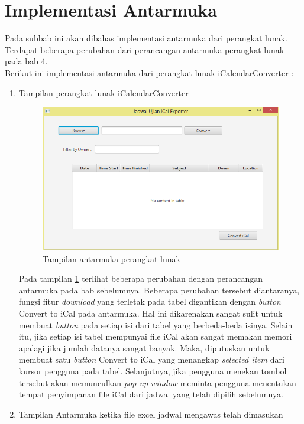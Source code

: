 \section{Implementasi Antarmuka}
Pada subbab ini akan dibahas implementasi antarmuka dari perangkat lunak. Terdapat beberapa perubahan dari perancangan antarmuka perangkat lunak pada bab 4.\\ 
Berikut ini implementasi antarmuka dari perangkat lunak iCalendarConverter :
\begin{enumerate}
	\item Tampilan perangkat lunak iCalendarConverter
		\begin{figure}[H]
		\centering
		\includegraphics[scale=0.7]{Gambar/implementAntarmuka}
		\caption{Tampilan antarmuka perangkat lunak}
		\label{fig:implementAntarmuka}
		\end{figure}
		Pada tampilan \ref{fig:implementAntarmuka} terlihat beberapa perubahan dengan perancangan antarmuka pada bab sebelumnya. Beberapa perubahan tersebut diantaranya, fungsi fitur \textit{download} yang terletak pada tabel digantikan dengan \textit{button} Convert to iCal pada antarmuka. Hal ini dikarenakan sangat sulit untuk membuat \textit{button} pada setiap isi dari tabel yang berbeda-beda isinya. Selain itu, jika setiap isi tabel mempunyai file iCal akan sangat memakan memori apalagi jika jumlah datanya sangat banyak. Maka, diputuskan untuk membuat satu \textit{button} Convert to iCal yang menangkap \textit{selected item} dari kursor pengguna pada tabel. Selanjutnya, jika pengguna menekan tombol tersebut akan memunculkan \textit{pop-up window} meminta pengguna menentukan tempat penyimpanan file iCal dari jadwal yang telah dipilih sebelumnya.     
	\item Tampilan Antarmuka ketika file excel jadwal mengawas telah dimasukan

\end{enumerate}

